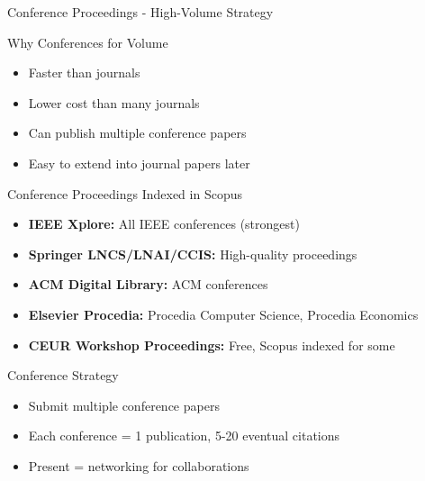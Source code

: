 \documentclass[11pt]{beamer}
\begin{document}
	\begin{frame}{Conference Proceedings - High-Volume Strategy}
		\scriptsize
		\begin{block}{Why Conferences for Volume}
			\begin{itemize}
				\item Faster than journals
				\item Lower cost than many journals
				\item Can publish multiple conference papers
				\item Easy to extend into journal papers later
			\end{itemize}
		\end{block}
		\begin{block}{Conference Proceedings Indexed in Scopus}
			\begin{itemize}
				\item \textbf{IEEE Xplore:} All IEEE conferences (strongest)
				\item \textbf{Springer LNCS/LNAI/CCIS:} High-quality proceedings
				\item \textbf{ACM Digital Library:} ACM conferences
				\item \textbf{Elsevier Procedia:} Procedia Computer Science, Procedia Economics
				\item \textbf{CEUR Workshop Proceedings:} Free, Scopus indexed for some
			\end{itemize}
		\end{block}
		\begin{block}{Conference Strategy}
			\begin{itemize}
				\item Submit multiple conference papers
				\item Each conference = 1 publication, 5-20 eventual citations
				\item Present = networking for collaborations
			\end{itemize}
		\end{block}
	\end{frame}
	
\end{document}
